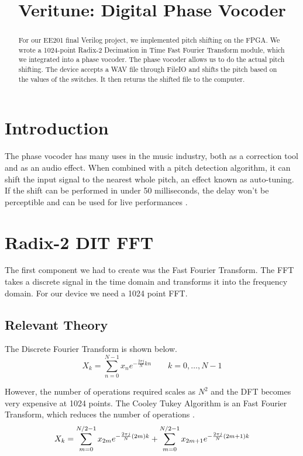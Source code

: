 \documentclass[twoside]{article}
\title{Veritune: Digital Phase Vocoder}
\begin{document}
\maketitle
%
\begin{abstract}
	For our EE201 final Verilog project, we implemented pitch shifting on the FPGA. We wrote a 1024-point Radix-2 Decimation
	in Time Fast Fourier Transform module, which we integrated into a phase vocoder.  The phase vocoder allows us to do
	the actual pitch shifting. The device accepts a WAV file through FileIO and shifts the pitch based on the values of the 
	switches.  It then returns the shifted file to the computer.
\end{abstract}

%
%
%
%
\section{Introduction}
  The phase vocoder has many uses in the music industry, both as a correction tool and as an audio effect.
  When combined with a pitch detection algorithm, it can shift the input signal to the nearest whole pitch, an effect known as auto-tuning.
  If the shift can be performed in under 50 milliseconds, the delay won't be perceptible and can be used for live performances \cite{bib:guitarpitchshifter}.
  

  
%
%
%
%
\section{Radix-2 DIT FFT}
  The first component we had to create was the Fast Fourier Transform. The FFT takes a discrete signal in the time domain and 
  transforms it into the frequency domain. For our device we need a 1024 point FFT.
  \subsection{Relevant Theory}
  The Discrete Fourier Transform is shown below.
  \begin{equation}
  	X_k = \sum_{n=0}^{N-1} x_n e^{-\frac{2 \pi j}{N} k n} \quad \quad k = 0, \dots, N-1
  	\label{eqn:dft}
  \end{equation}
  
  However, the number of operations required scales as $N^2$ and the DFT becomes very expensive at 1024 points.
  The Cooley Tukey Algorithm is an Fast Fourier Transform, which reduces the number of operations \cite{bib:ctdft}.
  \begin{equation}
  	 X_k  =	 \sum \limits_{m=0}^{N/2-1} x_{2m}     e^{-\frac{2\pi j}{N} (2m)k}\\   +  \sum \limits_{m=0}^{N/2-1} x_{2m+1} e^{-\frac{2\pi j}{N} (2m+1)k}
  	\label{eqn:ctdft}
  \end{equation} 
  
\end{document}
